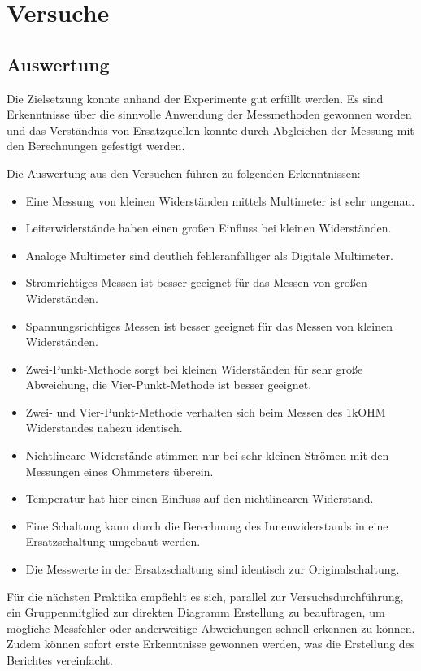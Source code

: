 \part{Versuche}







\chapter{Auswertung}

Die Zielsetzung konnte anhand der Experimente gut erfüllt werden.
Es sind Erkenntnisse über die sinnvolle Anwendung der Messmethoden gewonnen worden und das Verständnis von Ersatzquellen konnte durch Abgleichen der Messung mit den Berechnungen gefestigt werden.

Die Auswertung aus den Versuchen führen zu folgenden Erkenntnissen:
\begin{itemize}
  \item Eine Messung von kleinen Widerständen mittels Multimeter ist sehr ungenau.
  \item Leiterwiderstände haben einen großen Einfluss bei kleinen Widerständen.
  \item Analoge Multimeter sind deutlich fehleranfälliger als Digitale Multimeter.
  \item Stromrichtiges Messen ist besser geeignet für das Messen von großen Widerständen.
  \item Spannungsrichtiges Messen ist besser geeignet für das Messen von kleinen Widerständen.
  \item Zwei-Punkt-Methode sorgt bei kleinen Widerständen für sehr große Abweichung, die Vier-Punkt-Methode ist besser geeignet.
  \item Zwei- und Vier-Punkt-Methode verhalten sich beim Messen des 1kOHM Widerstandes nahezu identisch.
  \item Nichtlineare Widerstände stimmen nur bei sehr kleinen Strömen mit den Messungen eines Ohmmeters überein.
  \item Temperatur hat hier einen Einfluss auf den nichtlinearen Widerstand.
  \item Eine Schaltung kann durch die Berechnung des Innenwiderstands in eine Ersatzschaltung umgebaut werden.
  \item Die Messwerte in der Ersatzschaltung sind identisch zur Originalschaltung.
\end{itemize}
Für die nächsten Praktika empfiehlt es sich, parallel zur Versuchsdurchführung, ein Gruppenmitglied zur direkten Diagramm Erstellung zu beauftragen, um mögliche Messfehler oder anderweitige Abweichungen schnell erkennen zu können.
Zudem können sofort erste Erkenntnisse gewonnen werden, was die Erstellung des Berichtes vereinfacht.
